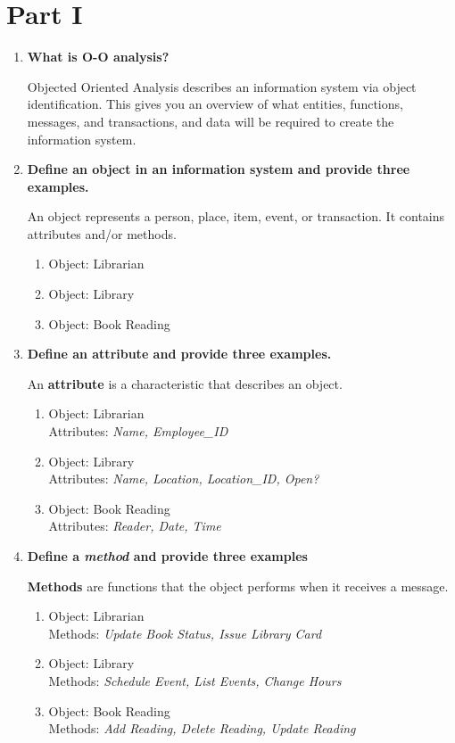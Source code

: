 \documentclass{article}
\begin{document}
\thispagestyle{fancy}
\section{Part I}
\begin{enumerate}
    \item \textbf{What is O-O analysis?}
    
    Objected Oriented Analysis describes an information system via object identification. This gives you an overview of what entities, functions, messages, and transactions, and data will be required to create the information system. 

    \item \textbf{Define an object in an information system and provide three examples.}
    
    An object represents a person, place, item, event, or transaction. It contains attributes and/or methods.
    \begin{enumerate}[leftmargin=2cm]
      \item Object: Librarian
      \item Object: Library
      \item Object: Book Reading
    \end{enumerate}

    \item \textbf{Define an attribute and provide three examples.}

    An \textbf{attribute} is a characteristic that describes an object.
    \begin{enumerate}[leftmargin=2cm]
      \item Object: Librarian \\ 
            Attributes: \textit{Name, Employee\_ID}
      \item Object: Library \\
            Attributes: \textit{Name, Location, Location\_ID, Open?}
      \item Object: Book Reading \\
            Attributes: \textit{Reader, Date, Time}
    \end{enumerate}

  \item \textbf{Define a \textit{method} and provide three examples}

  \textbf{Methods} are functions that the object performs when it receives a message.
    \begin{enumerate}[leftmargin=2cm]
      \item Object: Librarian \\
            Methods: \textit{Update Book Status, Issue Library Card}
      \item Object: Library \\
            Methods: \textit{Schedule Event, List Events, Change Hours}
      \item Object: Book Reading \\
            Methods: \textit{Add Reading, Delete Reading, Update Reading}
    \end{enumerate}


\end{enumerate}
\end{document}
